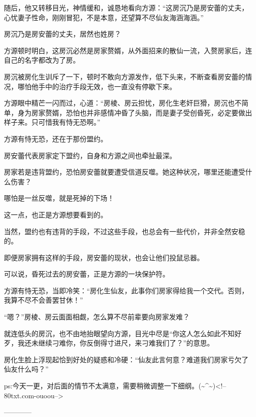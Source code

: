 \begin{this_body}
随后，他又转移目光，神情缓和，诚恳地看向方源：“这房沉乃是房安蕾的丈夫，心忧妻子性命，刚刚冒犯，不是本意，还望算不尽仙友海涵海涵。”

房沉乃是房安蕾的丈夫，居然也姓房？

方源顿时明白，这房沉必然是房家赘婿，从外面招来的散仙一流，入赘房家后，连自己的名字都改为了房。

房沉被房化生训斥了一下，顿时不敢向方源发作，低下头来，不断查看房安蕾的情况，哪怕他手中的治疗手段无效，也一直没有停歇下来。

方源眼中精芒一闪而过，心道：“房棱、房云担忧，房化生老奸巨猾，房沉也不简单，身为房家赘婿，恐怕也并非感情冲昏了头脑，而是妻子受创昏死，必定要做出样子来。只可惜我有恃无恐啊。”

方源有恃无恐，还在于那份盟约。

房安蕾代表房家定下盟约，自身和方源之间也牵扯最深。

房家若是违背盟约，恐怕房安蕾就要遭受信道反噬。她这种状况，哪里还能遭受什么伤害？

哪怕是一丝反噬，就是死掉的下场！

这一点，也正是方源想要看到的。

当然，盟约也有违背的手段，不过这些手段，也总会有一些代价，并非全然安稳的。

即便房家拥有这样的手段，房安蕾的现状，也会让他们投鼠忌器。

可以说，昏死过去的房安蕾，正是方源的一块保护符。

方源有恃无恐，当即冷笑：“房化生仙友，此事你们房家得给我一个交代。否则，我算不尽不会善罢甘休！”

“嗯？”房棱、房云面面相觑，怎么算不尽前辈要向房家发难？

就连低头的房沉，也不由地抬眼望向方源，目光中尽是“你这人怎么如此不知好歹，我还未继续刁难你，你反倒得寸进尺，来刁难我们了？”的意思。

房化生脸上浮现起恰到好处的疑惑和冷硬：“仙友此言何意？难道我们房家亏欠了仙友什么吗？”

ps:今天一更，对后面的情节不太满意，需要稍微调整一下细纲。(\~{}\^{}\~{})<!--80txt.com-ouoou-->

------------

\end{this_body}

